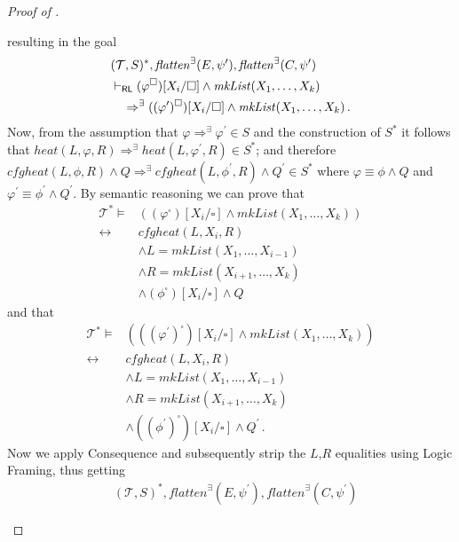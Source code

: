 \begin{proof}[Proof of ]
\begin{enumerate}
    resulting in the goal
    \begin{align*}
        & (\mathcal{T}, S)^*, \mathit{flatten}^\exists(E, \psi^\prime), \mathit{flatten}^\exists(C, \psi^\prime)
        \\& \vdash_{\mathsf{RL}}
        (\varphi^\square)[X_i/\square] \land
        \mathit{mkList}(X_1, \ldots, X_k)
        \\&\quad \Rightarrow^\exists
        ((\varphi^\prime)^\square)[X_i/\square] \land
        \mathit{mkList}(X_1, \ldots, X_k)
        \, .
    \end{align*}
    Now, from the assumption that $\varphi \Rightarrow^\exists \varphi^\prime \in S$ and the construction of $S^*$
    it follows that
    $\mathit{heat}(L, \varphi, R) \Rightarrow^\exists \mathit{heat}(L, \varphi^\prime, R) \in S^*$;
    and therefore
    $\mathit{cfgheat}(L, \phi, R) \land Q \Rightarrow^\exists \mathit{cfgheat}(L, \phi^\prime, R) \land Q^\prime \in S^*$
    where $\varphi \equiv \phi \land Q$ and $\varphi^\prime \equiv \phi^\prime \land Q^\prime$.
    By semantic reasoning we can prove that
    \begin{align*}
        \mathcal{T}^* \vDash & ((\varphi^\square)[X_i/\square] \land \mathit{mkList}(X_1, \ldots, X_k))
        \\ \leftrightarrow  &
        \mathit{cfgheat}(L, X_i, R)
        \\ & \land L = \mathit{mkList}(X_1, \ldots, X_{i-1})
        \\ & \land R = \mathit{mkList}(X_{i+1}, \ldots, X_k)
        \\ & \land (\phi^\square)[X_i/\square] \land Q
    \end{align*}
    and that
    \begin{align*}
        \mathcal{T}^* \vDash & (((\varphi^\prime)^\square)[X_i/\square] \land \mathit{mkList}(X_1, \ldots, X_k))
        \\ \leftrightarrow  &
        \mathit{cfgheat}(L, X_i, R)
        \\ & \land L = \mathit{mkList}(X_1, \ldots, X_{i-1})
        \\ & \land R = \mathit{mkList}(X_{i+1}, \ldots, X_k)
        \\ & \land ((\phi^\prime)^\square)[X_i/\square] \land Q^\prime \, .
    \end{align*}
    Now we apply Consequence and subsequently strip the $L$,$R$ equalities using Logic Framing, thus getting
    \begin{align*}
        & (\mathcal{T}, S)^*, \mathit{flatten}^\exists(E, \psi^\prime), \mathit{flatten}^\exists(C, \psi^\prime)

\end{align*}
\end{enumerate}
\end{proof}
